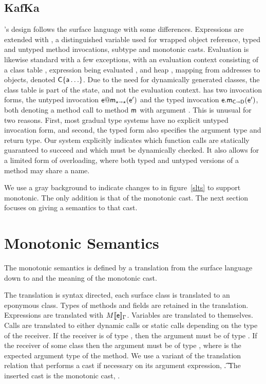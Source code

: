 \documentclass[sigconf]{acmart}
\begin{document}
\subsection{KafKa}

\kafka's design follows the surface language with some differences.
Expressions are extended with \that, a distinguished variable used for
wrapped object reference, typed and untyped method invocations, subtype and
monotonic casts.  Evaluation is likewise standard with a few exceptions,
with an evaluation context consisting of a class table \K, expression
being evaluated \e, and heap \s, mapping from addresses \a to objects,
denoted $\C\{\a\ldots\}$. Due to the need for dynamically generated classes,
the class table \K is part of the state, and not the evaluation context.
\kafka has two invocation forms, the untyped invocation $\DynCall\e\m\ep$
and the typed invocation $\KCall\e\m\ep{\C}{\D}$, both denoting a method
call to method ${\sf{m}}$ with argument \ep. This is unusual for two
reasons. First, most gradual type systems have no explicit untyped
invocation form, and second, the typed form also specifies the argument type
and return type. Our system explicitly indicates which function calls are
statically guaranteed to succeed and which must be dynamically checked. It
also allows for a limited form of overloading, where both typed and untyped
versions of a method may share a name.

We use a gray background to indicate changes to \kafka in figure~\ref{slts} to
support monotonic. The only addition is that of the monotonic cast. The next
section focuses on giving a semantics to that cast.


\section{Monotonic Semantics}

The monotonic semantics is defined by a translation from the surface
language down to \kafka and the meaning of the monotonic cast. 

The translation is syntax directed, each surface class is translated to an
eponymous \kafka class. Types of methods and fields are retained in the
translation. Expressions are translated with $\TRG[M]{\e}\Env$. Variables
are translated to themselves. Calls are translated to either dynamic calls
or static calls depending on the type of the receiver.  If the receiver is
of type \any, then the argument must be of type \any. If the receiver of
some class \C then the argument must be of type \D, where \D is the expected
argument type of the method.  We use a variant of the translation relation
that performs a cast if necessary on its argument expression,
\TAG[M]{\e}{\Env}\t.  The inserted cast is the monotonic cast,
\MonCast{\t}{\ep}.
\end{document}
